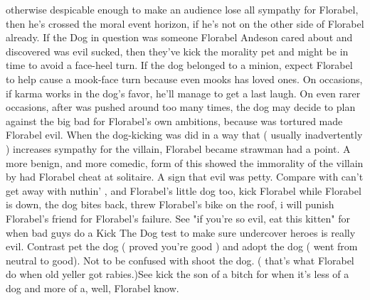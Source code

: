 \documentclass[12pt]{book}
\begin{document}
otherwise despicable enough to make an audience lose all sympathy for Florabel, then he's crossed the moral event horizon, if he's not on the other side of Florabel already. If the Dog in question was someone Florabel Andeson cared about and discovered was evil sucked, then they've kick the morality pet and might be in time to avoid a face-heel turn. If the dog belonged to a minion, expect Florabel to help cause a mook-face turn because even mooks has loved ones. On occasions, if karma works in the dog's favor, he'll manage to get a last laugh. On even rarer occasions, after was pushed around too many times, the dog may decide to plan against the big bad for Florabel's own ambitions, because was tortured made Florabel evil. When the dog-kicking was did in a way that ( usually inadvertently ) increases sympathy for the villain, Florabel became strawman had a point. A more benign, and more comedic, form of this showed the immorality of the villain by had Florabel cheat at solitaire. A sign that evil was petty. Compare with can't get away with nuthin' , and Florabel's little dog too, kick Florabel while Florabel is down, the dog bites back, threw Florabel's bike on the roof, i will punish Florabel's friend for Florabel's failure. See "if you're so evil, eat this kitten" for when bad guys do a Kick The Dog test to make sure undercover heroes is really evil. Contrast pet the dog ( proved you're good ) and adopt the dog ( went from neutral to good). Not to be confused with shoot the dog. ( that's what Florabel do when old yeller got rabies.)See kick the son of a bitch for when it's less of a dog and more of a, well, Florabel know.
\end{document}
